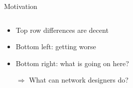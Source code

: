 \documentclass{beamer}
\begin{document}
%
\begin{frame}{Motivation}
\begin{columns}
	\begin{column}[T]{0.3\textwidth}
		\begin{itemize}
			\item Top row differences are decent
			\item Bottom left: getting worse
			\item Bottom right: what is going on here?
			\item[$\Rightarrow$] What can network designers do?
		\end{itemize}
	\end{column}
	\begin{column}[T]{0.7\textwidth}
		\begin{figure}
		\centering
			\\

\end{figure}
\end{column}
\end{columns}
\end{frame}
\end{document}
